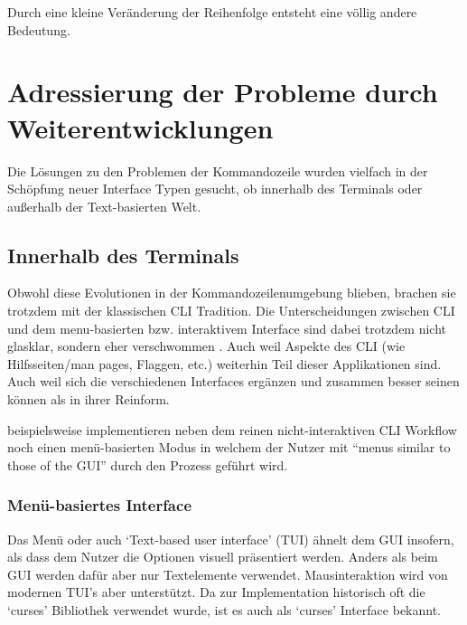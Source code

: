 \documentclass[oneside,bibliography=totocnumbered,BCOR=5mm]{scrbook}
\begin{document}
Durch eine kleine Veränderung der Reihenfolge entsteht eine völlig andere
Bedeutung.

\section{Adressierung der Probleme durch Weiterentwicklungen}
\label{sec:weiterentwicklungen}

Die Lösungen zu den Problemen der Kommandozeile wurden vielfach in der Schöpfung
neuer Interface Typen gesucht, ob innerhalb des Terminals oder außerhalb der
Text-basierten Welt.

\subsection{Innerhalb des Terminals}

Obwohl diese Evolutionen in der Kommandozeilenumgebung blieben, brachen sie
trotzdem mit der klassischen CLI Tradition. Die Unterscheidungen zwischen
CLI und dem menu-basierten bzw. interaktivem Interface sind dabei trotzdem
nicht glasklar, sondern eher verschwommen \parencite{Paap_1988}. Auch weil
Aspekte des CLI (wie Hilfsseiten/man pages, Flaggen, etc.) weiterhin Teil dieser
Applikationen sind. Auch weil sich die verschiedenen Interfaces ergänzen und
zusammen besser seinen können als in ihrer Reinform.

\textcite{bland2007design} beispielsweise implementieren neben dem reinen
nicht-interaktiven CLI Workflow noch einen menü-basierten Modus in welchem der
Nutzer mit ``menus similar to those of the GUI'' durch den Prozess geführt wird.

\subsubsection{Menü-basiertes Interface}
\label{sec:def-menu}

Das Menü oder auch `Text-based user interface' (TUI) ähnelt dem GUI insofern,
als dass dem Nutzer die Optionen visuell präsentiert werden. Anders als beim GUI
werden dafür aber nur Textelemente verwendet. Mausinteraktion wird von modernen
TUI's aber unterstützt. Da zur Implementation historisch oft die `curses'
Bibliothek verwendet wurde, ist es auch als `curses' Interface bekannt.

\medskip
\end{document}
